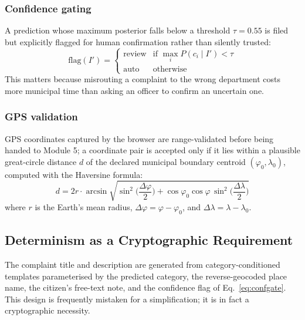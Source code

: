 \documentclass[conference]{IEEEtran}
\begin{document}
\subsubsection{Confidence gating}
A prediction whose maximum posterior falls below a threshold $\tau = 0.55$ is filed but explicitly flagged for human confirmation rather than silently trusted:
\begin{equation}
\mathrm{flag}(I') =
\begin{cases}
\text{review} & \text{if } \max_i P(c_i \mid I') < \tau \\
\text{auto} & \text{otherwise}
\end{cases}
\label{eq:confgate}
\end{equation}
This matters because misrouting a complaint to the wrong department costs more municipal time than asking an officer to confirm an uncertain one.

\subsubsection{GPS validation}
GPS coordinates captured by the browser are range-validated before being handed to Module 5; a coordinate pair is accepted only if it lies within a plausible great-circle distance $d$ of the declared municipal boundary centroid $(\varphi_0,\lambda_0)$, computed with the Haversine formula:
\begin{equation}
d = 2r \cdot \arcsin\!\sqrt{\sin^2\!\Big(\frac{\Delta\varphi}{2}\Big) + \cos\varphi_0\cos\varphi\,\sin^2\!\Big(\frac{\Delta\lambda}{2}\Big)}
\label{eq:haversine}
\end{equation}
where $r$ is the Earth's mean radius, $\Delta\varphi = \varphi - \varphi_0$, and $\Delta\lambda = \lambda - \lambda_0$.

\subsection{Determinism as a Cryptographic Requirement}
\label{sec:determinism}
The complaint title and description are generated from category-conditioned templates parameterised by the predicted category, the reverse-geocoded place name, the citizen's free-text note, and the confidence flag of Eq.~\ref{eq:confgate}. This design is frequently mistaken for a simplification; it is in fact a cryptographic necessity.
\end{document}
